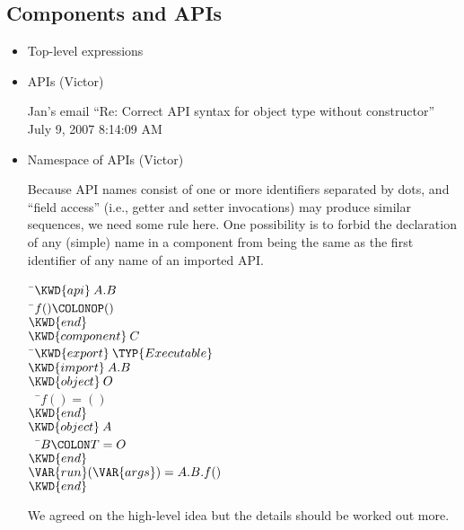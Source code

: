 \subsection{Components and APIs}
\begin{itemize}
\item Top-level expressions

\item APIs (Victor)

Jan's email ``Re: Correct API syntax for object type without constructor''
July 9, 2007 8:14:09 AM

\item Namespace of APIs (Victor)

Because API names consist of one or more identifiers separated by dots, and ``field access'' (i.e., getter and setter invocations) may produce similar sequences, we need some rule here. One possibility is to forbid the declaration of any (simple) name in a component from being the same as the first identifier of any name of an imported API.


\begin{Fortress}
{\tt~}\pushtabs\=\+\( \KWD{api}\:A.B\)\\
{\tt~}\pushtabs\=\+\(  f()\COLONOP()\)\-\\\poptabs
\( \KWD{end}\)\\[4pt]
\( \KWD{component}\:C\)\\
{\tt~}\pushtabs\=\+\(  \KWD{export}\:\TYP{Executable}\)\\
\(  \KWD{import}\:A.B\)\\
\(  \KWD{object}\:O\)\\
{\tt~~}\pushtabs\=\+\(    f() = ()\)\-\\\poptabs
\(  \KWD{end}\)\\
\(  \KWD{object}\:A\)\\
{\tt~~}\pushtabs\=\+\(    B\COLON T = O\)\-\\\poptabs
\(  \KWD{end}\)\\
\(  \VAR{run}(\VAR{args}) = A.B.f()\)\-\\\poptabs
\( \KWD{end}\)\-\\\poptabs
\end{Fortress}
We agreed on the high-level idea but the details should be worked out more.


\end{itemize}
